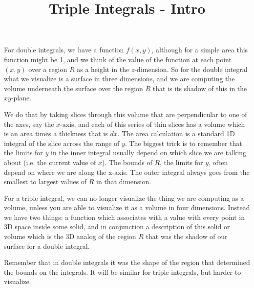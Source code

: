 \documentclass[11pt, oneside]{article}   	%
\title{Triple Integrals - Intro}
\date{}							%
\begin{document}
\maketitle
\Large

For double integrals, we have a function $f(x,y)$, although for a simple area this function might be 1, and we think of the value of the function at each point $(x,y)$ over a region $R$ as a height in the $z$-dimension.  So for the double integral what we visualize is a surface in three dimensions, and  we are computing the volume underneath the surface over the region $R$ that is its shadow of this in the $xy$-plane.

We do that by taking slices through this volume that are perpendicular to one of the axes, say the $x$-axis, and each of this series of thin slices has a volume which is an area times a thickness that is $dx$.  The area calculation is a standard 1D integral of the slice across the range of $y$.  The biggest trick is to remember that the limits for $y$ in the inner integral usually depend on which slice we are talking about (i.e. the current value of $x$).  The bounds of $R$, the limits for $y$, often depend on where we are along the x-axis.  The outer integral always goes from the smallest to largest values of $R$ in that dimension.

For a triple integral, we can no longer visualize the thing we are computing as a volume, unless you are able to visualize it as a volume in four dimensions.  Instead we have two things:  a function which associates with a value with every point in 3D space inside some solid, and in conjunction a description of this solid or volume which is the 3D analog of the region $R$ that was the shadow of our surface for a double integral.

Remember that in double integrals it was the shape of the region that determined the bounds on the integrals.  It will be similar for triple integrals, but harder to visualize.
\end{document}
